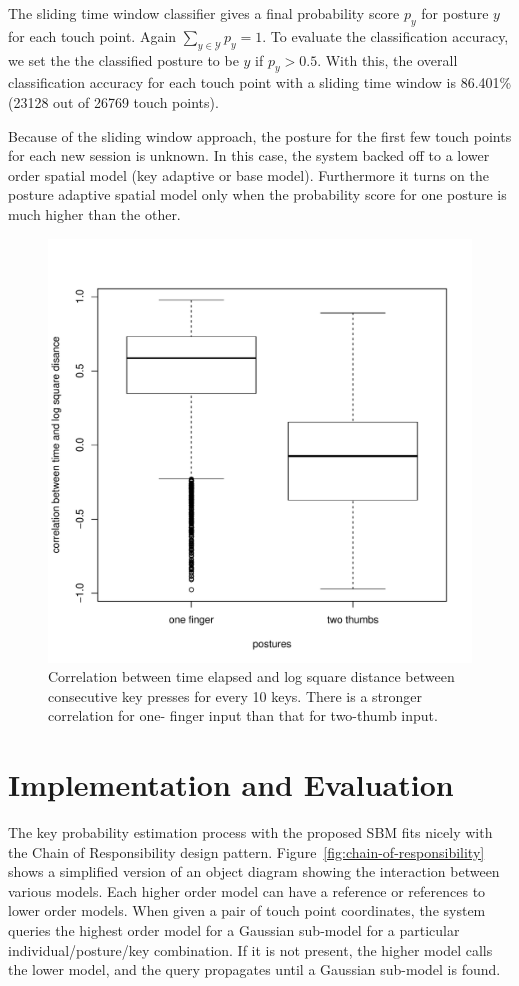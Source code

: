 \documentclass{sigchi}
\begin{document}
The sliding time window classifier gives a final probability score $p_y$ for posture
$y$ for each touch point. Again $\displaystyle\sum_{y\in \mathcal{Y}}p_y = 1$. To evaluate the classification accuracy, we set the the
classified posture to be $y$ if $p_y > 0.5$. With this, the overall classification 
accuracy for each touch point with a sliding time window
is 86.401\% (23128 out of 26769 touch points).

Because of the sliding window approach, the posture for the first few touch points  
for each new session is unknown. In this case, the system backed off to a lower order spatial 
model (key adaptive or base model). Furthermore  it turns on the posture 
adaptive spatial model only when the probability score for one posture is much 
higher than the other.

\begin{figure}[tb]
  \centering
  \includegraphics[width=0.8\columnwidth]{figures/boxplot.pdf}
  \caption{Correlation between time elapsed and log square distance between
  consecutive key presses for every 10 keys. There is a stronger correlation for
  one- finger input than that for two-thumb input.}
  \label{fig:boxplot}
\end{figure}

\section{Implementation and Evaluation}
The key probability estimation process with the proposed SBM fits nicely with the
Chain of Responsibility design pattern.
Figure~\ref{fig:chain-of-responsibility} shows a simplified version of an object
diagram showing the interaction between various models. Each higher order model can
have a reference or references to lower order models. When given a pair of touch
point coordinates, the system queries the highest order model for a Gaussian
sub-model for a particular individual/posture/key combination. If it is not present, 
the higher model calls the lower model, and the
query propagates until a Gaussian sub-model is found. 
\end{document}
